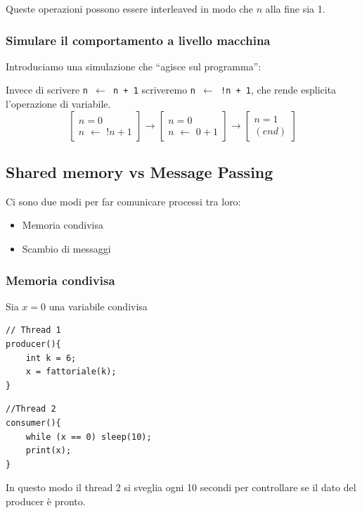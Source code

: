 \documentclass[a4paper,10pt]{article}
\begin{document}
Queste operazioni possono essere interleaved in modo che $n$ alla fine sia 1.

\subsubsection{Simulare il comportamento a livello macchina}

Introduciamo una simulazione che ``agisce sul programma'': 

Invece di scrivere \texttt{n $\leftarrow$ n + 1} scriveremo \texttt{n $\leftarrow$ !n + 1}, che rende esplicita l'operazione di variabile.
\[ \begin{bmatrix}
    n = 0\\
    n\,\, \leftarrow \,\,!n+1
   \end{bmatrix} \longrightarrow
   \begin{bmatrix}
    n = 0\\
    n\,\, \leftarrow \,\,0+1
   \end{bmatrix} \longrightarrow
   \begin{bmatrix}
    n = 1\\
    (end)
   \end{bmatrix}
 \]

\subsection{Shared memory vs Message Passing}
Ci sono due modi per far comunicare processi tra loro:

\begin{itemize}
 \item Memoria condivisa
 \item Scambio di messaggi
\end{itemize}

\subsubsection{Memoria condivisa}
Sia $x = 0$ una variabile condivisa
 \begin{multicols}{2}
  \begin{lstlisting}
// Thread 1
producer(){
    int k = 6;
    x = fattoriale(k);
}
\end{lstlisting}
\begin{lstlisting}
//Thread 2
consumer(){
    while (x == 0) sleep(10);
    print(x);
}
\end{lstlisting}

\end{multicols}
In questo modo il thread 2 si sveglia ogni 10 secondi per controllare se il dato del producer è pronto.\newpage
\end{document}
